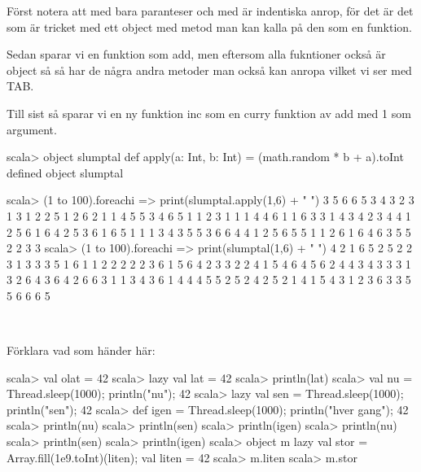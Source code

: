 \TaskSolved \what


\SubtaskSolved
Först notera att  med bara paranteser och med  är indentiska anrop, för det är det som är tricket med ett object med  metod man kan kalla på den som en funktion.

Sedan sparar vi en funktion som add, men eftersom alla fukntioner också är object så så har de några andra metoder man också kan anropa vilket vi ser med TAB.

Till sist så sparar vi en ny funktion inc som en curry funktion av add med 1 som argument.

\SubtaskSolved
\begin{REPL}
scala> object slumptal{ def apply(a: Int, b: Int) = (math.random * b + a).toInt }
defined object slumptal

scala> (1 to 100).foreach{i => print(slumptal.apply(1,6) + " ")}
3 5 6 6 5 3 4 3 2 3 1 3 1 2 2 5 1 2 6 2 1 1 4 5 5 3 4 6 5 1 1 2 3 1 1 1 4 4 6 1 1 6 3 3 1 4 3 4 2 3 4 4 1 2 5 6 1 6 4 2 5 3 6 1 6 5 1 1 1 3 4 3 5 5 3 6 6 4 4 1 2 5 6 5 5 1 1 2 6 1 6 4 6 3 5 5 2 2 3 3
scala> (1 to 100).foreach{i => print(slumptal(1,6) + " ")}
4 2 1 6 5 2 5 2 2 3 1 3 3 3 5 1 6 1 1 2 2 2 2 2 3 6 1 5 6 4 2 3 3 2 2 4 1 5 4 6 4 5 6 2 4 4 3 4 3 3 3 1 3 2 6 4 3 6 4 2 6 6 3 1 1 3 4 3 6 1 4 4 4 5 5 2 5 2 4 2 5 2 1 4 1 5 4 3 1 2 3 6 3 3 5 5 6 6 6 5

\end{REPL}



\QUESTEND









\QUESTBEGIN

\Task  \what~

\Subtask \label{subtask:delayalloc} Förklara vad som händer här:
\begin{REPL}
scala> val olat = 42
scala> lazy val lat = 42
scala> println(lat)
scala> val nu = {Thread.sleep(1000); println("nu"); 42}
scala> lazy val sen = {Thread.sleep(1000); println("sen"); 42}
scala> def igen = {Thread.sleep(1000); println("hver gang"); 42}
scala> println(nu)
scala> println(sen)
scala> println(igen)
scala> println(nu)
scala> println(sen)
scala> println(igen)
scala> object m {lazy val stor = Array.fill(1e9.toInt)(liten); val liten = 42}
scala> m.liten
scala> m.stor
\end{REPL}

